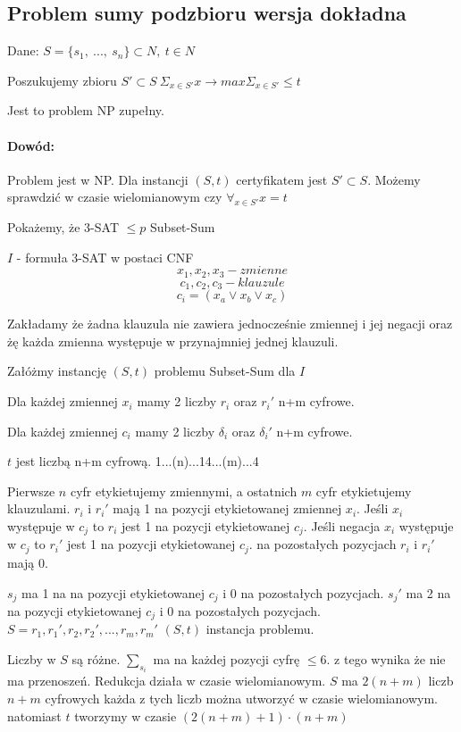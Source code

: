 \subsection{Problem sumy podzbioru wersja dokładna}
Dane: $S=\lbrace s_1,\ ...,\ s_n \rbrace \subset N,\ t\in N$

Poszukujemy zbioru $S'\subset S\ \Sigma_{x\in S'}x \rightarrow max\Sigma_{x\in S'}\leq t$

Jest to problem NP zupełny.

\paragraph{Dowód:}Problem jest w NP. Dla instancji $(S,t)$ certyfikatem jest $S' \subset S$. Możemy sprawdzić w czasie wielomianowym czy $ \forall_{x \in S'} x = t $ 

Pokażemy, że 3-SAT $ \leq p $ Subset-Sum 

$I$ - formuła 3-SAT w postaci CNF
$$ x_1, x_2, x_3 - zmienne$$
$$ c_1, c_2, c_3 - klauzule$$
$$ c_i = (x_a \lor x_b \lor x_c)$$

Zakładamy że żadna klauzula nie zawiera jednocześnie zmiennej i jej negacji oraz żę każda zmienna występuje w przynajmniej jednej klauzuli.

Załóżmy instancję $(S,t)$ problemu Subset-Sum dla $I$

Dla każdej zmiennej $x_i$ mamy 2 liczby $r_i$ oraz $r_i'$ n+m cyfrowe.

Dla każdej zmiennej $c_i$ mamy 2 liczby $\delta_i$ oraz $\delta_i'$ n+m cyfrowe.

$t$ jest liczbą n+m cyfrową. 1...(n)...14...(m)...4

Pierwsze $n$ cyfr etykietujemy zmiennymi, a ostatnich $m$ cyfr etykietujemy klauzulami.
$r_i$ i $r_i'$ mają 1 na pozycji etykietowanej zmiennej $x_i$.
Jeśli $x_i$ występuje w $c_j$ to $r_i$ jest 1 na pozycji etykietowanej $c_j$.
Jeśli negacja $x_i$ występuje w $c_j$ to $r_i'$ jest 1 na pozycji etykietowanej $c_j$. na pozostałych pozycjach $r_i$ i $r_i'$ mają 0.

$s_j$ ma 1 na na pozycji etykietowanej $c_j$ i 0 na pozostałych pozycjach.
$s_j'$ ma 2 na na pozycji etykietowanej $c_j$ i 0 na pozostałych pozycjach.
$S = {r_1, r_1', r_2, r_2', ..., r_m,r_m'}$
$(S,t)$ instancja problemu.

Liczby w $S$ są różne. $\sum_{s_i}$ ma na każdej pozycji cyfrę $\leq 6$.
z tego wynika że nie ma przenoszeń.
Redukcja działa w czasie wielomianowym.
$S$ ma $2(n+m)$ liczb $n+m$ cyfrowych każda z tych liczb można utworzyć w czasie wielomianowym. natomiast $t$ tworzymy w czasie $(2(n+m)+1)\cdot(n+m)$


